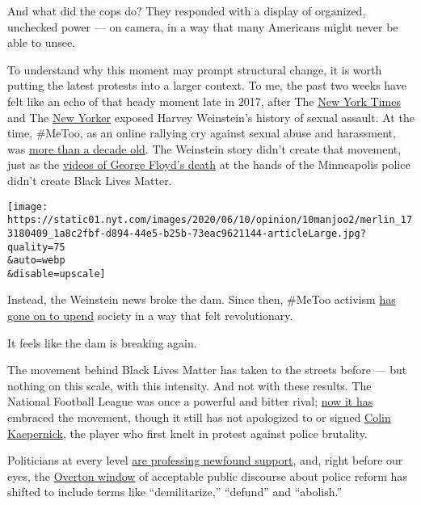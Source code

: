 And what did the cops do? They responded with a display of organized,
unchecked power --- on camera, in a way that many Americans might never
be able to unsee.

To understand why this moment may prompt structural change, it is worth
putting the latest protests into a larger context. To me, the past two
weeks have felt like an echo of that heady moment late in 2017, after
The
\href{https://www.nytimes.com/2017/10/05/us/harvey-weinstein-harassment-allegations.html}{New
York Times} and The
\href{https://www.newyorker.com/news/news-desk/from-aggressive-overtures-to-sexual-assault-harvey-weinsteins-accusers-tell-their-stories}{New
Yorker} exposed Harvey Weinstein's history of sexual assault. At the
time, \#MeToo, as an online rallying cry against sexual abuse and
harassment, was
\href{https://www.ajc.com/news/world/who-tarana-burke-meet-the-woman-who-started-the-too-movement-decade-ago/i8NEiuFHKaIvBh9ucukidK/}{more
than a decade old}. The Weinstein story didn't create that movement,
just as the
\href{https://www.nytimes.com/video/us/100000007159353/george-floyd-arrest-death-video.html}{videos
of George Floyd's death} at the hands of the Minneapolis police didn't
create Black Lives Matter.

\texttt{[image: https://static01.nyt.com/images/2020/06/10/opinion/10manjoo2/merlin\_173180409\_1a8c2fbf-d894-44e5-b25b-73eac9621144-articleLarge.jpg?quality=75\\\&auto=webp\\\&disable=upscale]}

Instead, the Weinstein news broke the dam. Since then, \#MeToo activism
\href{https://www.nbcnews.com/storyline/sexual-misconduct/weinstein-here-s-growing-list-men-accused-sexual-misconduct-n816546}{has
gone on to upend} society in a way that felt revolutionary.

It feels like the dam is breaking again.

The movement behind Black Lives Matter has taken to the streets before
--- but nothing on this scale, with this intensity. And not with these
results. The National Football League was once a powerful and bitter
rival;
\href{https://sports.yahoo.com/the-nf-ls-black-lives-matter-statement-was-years-in-the-making-013616877.html}{now
it has} embraced the movement, though it still has not apologized to or
signed
\href{https://www.nytimes.com/2020/06/05/sports/football/george-floyd-kaepernick-kneeling-nfl-protests.html}{Colin
Kaepernick}, the player who first knelt in protest against police
brutality.

Politicians at every level
\href{https://www.theatlantic.com/politics/archive/2020/06/mitt-romney-black-lives-matter/612808/}{are
professing newfound support}, and, right before our eyes, the
\href{https://www.nytimes.com/2019/02/26/us/politics/overton-window-democrats.html}{Overton
window} of acceptable public discourse about police reform has shifted
to include terms like ``demilitarize,'' ``defund'' and ``abolish.''

